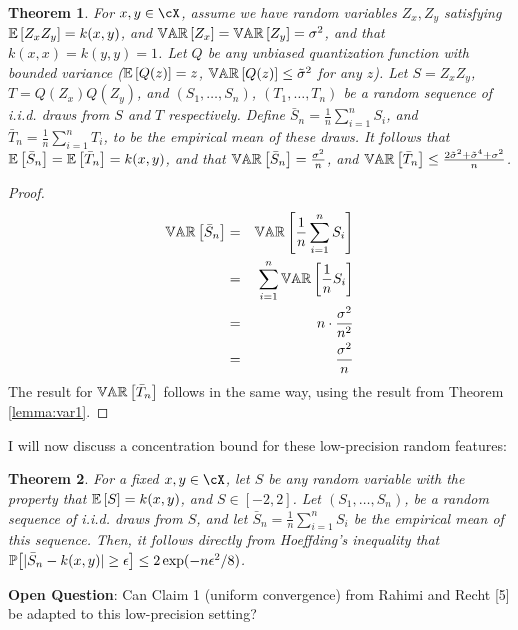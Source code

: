 \documentclass[12pt]{article}
\newcommand{\bS}{\bar{S}}
\newcommand{\bT}{\bar{T}}
\newcommand{\eps}{\epsilon}
\newcommand{\tsigma}{\tilde{\sigma}}
\newtheorem{theorem}{Theorem}[section]
\begin{document}
\begin{theorem}
\label{thm:varn}
For $x,y\in\cX$, assume we have random variables $Z_x,Z_y$ satisfying $\expect{}{Z_xZ_y} = k(x,y)$, and $\var{}{Z_x} = \var{}{Z_y} = \sigma^2$, and that $k(x,x) = k(y,y) = 1$.
Let $Q$ be any unbiased quantization function with bounded variance ($\expect{}{Q(z)} = z$, $\var{}{Q(z)} \leq \tsigma^2$ for any $z$).  Let $S=Z_x Z_y$, $T = Q(Z_x)Q(Z_y)$, and $(S_1,\ldots,S_n)$, $(T_1,\ldots,T_n)$ be a random sequence of i.i.d. draws from $S$ and $T$ respectively.  Define $\bar{S}_n = \frac{1}{n}\sum_{i=1}^n S_i$, and $\bar{T}_n =  \frac{1}{n}\sum_{i=1}^n T_i$, to be the empirical mean of these draws.  It follows that $\expect{}{\bS_n} = \expect{}{\bT_n} = k(x,y)$, and that
$\var{}{\bS_n} = \frac{\sigma^2}{n}$, and $\var{}{\bT_n} \leq \frac{2\tsigma^2 + \tsigma^4 +  \sigma^2}{n}$.
\end{theorem}
\begin{proof}
\begin{eqnarray*}
\var{}{\bS_n} &=& \var{}{\frac{1}{n}\sum_{i=1}^n S_i} \\
&=& \sum_{i=1}^n \var{}{\frac{1}{n}S_i} \\
&=& n \cdot \frac{\sigma^2}{n^2} \\
&=& \frac{\sigma^2}{n}
\end{eqnarray*}
The result for $\var{}{\bT_n}$ follows in the same way, using the result from Theorem \ref{lemma:var1}.
\end{proof}

I will now discuss a concentration bound for these low-precision random features:\\
\begin{theorem}
For a fixed $x,y\in\cX$, let $S$ be any random variable with the property that $\expect{}{S} = k(x,y)$, and $S \in [-2,2]$.  Let $(S_1,\ldots,S_n)$, be a random sequence of i.i.d. draws from $S$, and let $\bS_n = \frac{1}{n}\sum_{i=1}^n S_i$ be the empirical mean of this sequence.  Then, it follows directly from Hoeffding's inequality that $\Prob{\big[|\bS_n - k(x,y)| \geq \epsilon\big]} \leq 2\exp(-n\eps^2/8)$.
\end{theorem}

\noindent\textbf{Open Question}: Can Claim 1 (uniform convergence) from Rahimi and Recht [5] be adapted to this low-precision setting?
\end{document}
